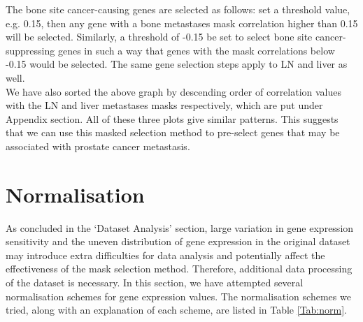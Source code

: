 \documentclass[12pt,a4paper]{report}
\begin{document}
The bone site cancer-causing genes are selected as follows: set a threshold value, e.g. 0.15, then any gene with a bone metastases mask correlation higher than 0.15 will be selected. Similarly, a threshold of -0.15 be set to select bone site cancer-suppressing genes in such a way that genes with the mask correlations below -0.15 would be selected. The same gene selection steps apply to LN and liver as well.\\

We have also sorted the above graph by descending order of correlation values with the LN and liver metastases masks respectively, which are put under Appendix section. All of these three plots give similar patterns. This suggests that we can use this masked selection method to pre-select genes that may be associated with prostate cancer metastasis.\\

\section{Normalisation}
As concluded in the ‘Dataset Analysis’ section, large variation in gene expression sensitivity and the uneven distribution of gene expression in the original dataset may introduce extra difficulties for data analysis and potentially affect the effectiveness of the mask selection method. Therefore, additional data processing of the dataset is necessary. In this section, we have attempted several normalisation schemes for gene expression values. The normalisation schemes we tried, along with an explanation of each scheme, are listed in Table \ref{Tab:norm}.\\
\end{document}
